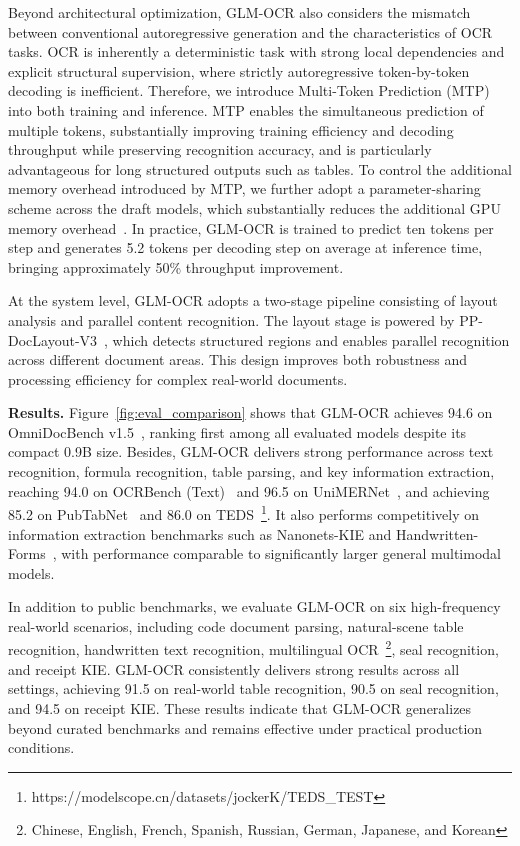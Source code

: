Beyond architectural optimization, GLM-OCR also considers the mismatch between conventional autoregressive generation and the characteristics of OCR tasks. OCR is inherently a deterministic task with strong local dependencies and explicit structural supervision, where strictly autoregressive token-by-token decoding is inefficient. Therefore, we introduce Multi-Token Prediction (MTP)~\cite{deepseekv3} into both training and inference. MTP enables the simultaneous prediction of multiple tokens, substantially improving training efficiency and decoding throughput while preserving recognition accuracy, and is particularly advantageous for long structured outputs such as tables. To control the additional memory overhead introduced by MTP, we further adopt a parameter-sharing scheme across the draft models, which substantially reduces the additional GPU memory overhead~\cite{glm5}. In practice, GLM-OCR is trained to predict ten tokens per step and generates 5.2 tokens per decoding step on average at inference time, bringing approximately 50\% throughput improvement.

At the system level, GLM-OCR adopts a two-stage pipeline consisting of layout analysis and parallel content recognition. The layout stage is powered by PP-DocLayout-V3~\cite{PaddleOCR-VL-1.5}, which detects structured regions and enables parallel recognition across different document areas. This design improves both robustness and processing efficiency for complex real-world documents.

\textbf{Results.} Figure~\ref{fig:eval_comparison} shows that GLM-OCR achieves 94.6 on OmniDocBench v1.5~\cite{OmniDocBench}, ranking first among all evaluated models despite its compact 0.9B size. Besides, GLM-OCR delivers strong performance across text recognition, formula recognition, table parsing, and key information extraction, reaching 94.0 on OCRBench (Text)~\cite{OCRBench} and 96.5 on UniMERNet~\cite{UniMERNet}, and achieving 85.2 on PubTabNet~\cite{PubTabNet} and 86.0 on TEDS~\footnote{https://modelscope.cn/datasets/jockerK/TEDS\_TEST}. It also performs competitively on information extraction benchmarks such as Nanonets-KIE and Handwritten-Forms~\cite{IDPLeaderboard}, with performance comparable to significantly larger general multimodal models.

In addition to public benchmarks, we evaluate GLM-OCR on six high-frequency real-world scenarios, including code document parsing, natural-scene table recognition, handwritten text recognition, multilingual OCR~\footnote{Chinese, English, French, Spanish, Russian, German, Japanese, and Korean}, seal recognition, and receipt KIE. GLM-OCR consistently delivers strong results across all settings, achieving 91.5 on real-world table recognition, 90.5 on seal recognition, and 94.5 on receipt KIE. These results indicate that GLM-OCR generalizes beyond curated benchmarks and remains effective under practical production conditions.

